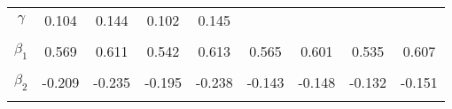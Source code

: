 \begin{footnotesize}
\begin{singlespace}
\begin{tabular}{ccccccccc}
$\gamma$ & 0.104 & 0.144 & 0.102 & 0.145 &  &  &  &  \\ 
 & \begin{tiny} [0.097,0.11] \end{tiny}  & \begin{tiny} [0.139,0.15] \end{tiny}  & \begin{tiny} [0.095,0.109] \end{tiny}  & \begin{tiny} [0.14,0.152] \end{tiny}  &  &  &  &  \\ 
$ \beta_{1} $ & 0.569 & 0.611 & 0.542 & 0.613 & 0.565 & 0.601 & 0.535 & 0.607 \\ 
 & \begin{tiny} [0.501,0.639] \end{tiny}  & \begin{tiny} [0.54,0.685] \end{tiny}  & \begin{tiny} [0.475,0.61] \end{tiny}  & \begin{tiny} [0.539,0.687] \end{tiny}  & \begin{tiny} [0.452,0.679] \end{tiny}  & \begin{tiny} [0.506,0.696] \end{tiny}  & \begin{tiny} [0.421,0.649] \end{tiny}  & \begin{tiny} [0.468,0.75] \end{tiny}  \\ 
$ \beta_{2} $ & -0.209 & -0.235 & -0.195 & -0.238 & -0.143 & -0.148 & -0.132 & -0.151 \\ 
 & \begin{tiny} [-0.278,-0.141] \end{tiny}  & \begin{tiny} [-0.307,-0.162] \end{tiny}  & \begin{tiny} [-0.261,-0.128] \end{tiny}  & \begin{tiny} [-0.311,-0.165] \end{tiny}  & \begin{tiny} [-0.23,-0.055] \end{tiny}  & \begin{tiny} [-0.222,-0.076] \end{tiny}  & \begin{tiny} [-0.22,-0.041] \end{tiny}  & \begin{tiny} [-0.26,-0.041] \end{tiny}  \\ 

\end{tabular}
\end{singlespace}
\end{footnotesize}
